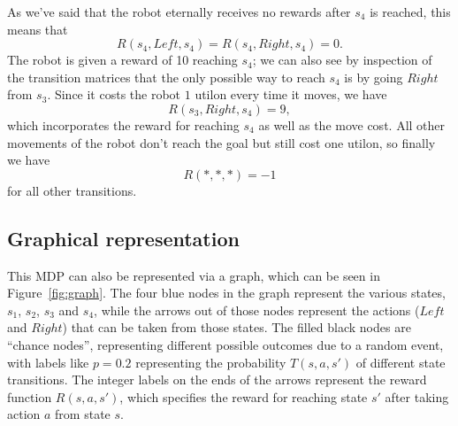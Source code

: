 \documentclass[a4paper]{article}
\begin{document}
As we've said that the robot eternally receives no rewards after $s_4$ is reached,
this means that
\begin{equation*}
  R(s_4, Left, s_4) = R(s_4, Right, s_4) = 0 .
\end{equation*}
The robot is given a reward of 10 reaching $s_4$;
we can also see by inspection of the transition matrices that the only possible
way to reach $s_4$ is by going $Right$ from $s_3$.
Since it costs the robot $1$ utilon every time it moves, we have
\begin{equation*}
  R(s_3, Right, s_4) = 9 ,
\end{equation*}
which incorporates the reward for reaching $s_4$ as well as the move cost.
All other movements of the robot don't reach the goal but still cost one
utilon, so finally we have
\begin{equation*}
  R(*, *, *) = -1
\end{equation*}
for all other transitions.

\subsection{Graphical representation}
This MDP can also be represented via a graph, which can be seen in
Figure~\ref{fig:graph}.
The four blue nodes in the graph represent the various states, $s_1$, $s_2$,
$s_3$ and $s_4$,
while the arrows out of those nodes represent the actions ($Left$ and $Right$)
that can be taken from those states.
The filled black nodes are ``chance nodes'', representing
different possible outcomes due to a random event,
with labels like $p=0.2$ representing the probability $T(s, a, s')$ of
different state transitions.
The integer labels on the ends of the arrows represent the reward function
$R(s, a, s')$, which specifies the reward for reaching state $s'$ after
taking action $a$ from state $s$.
\end{document}
